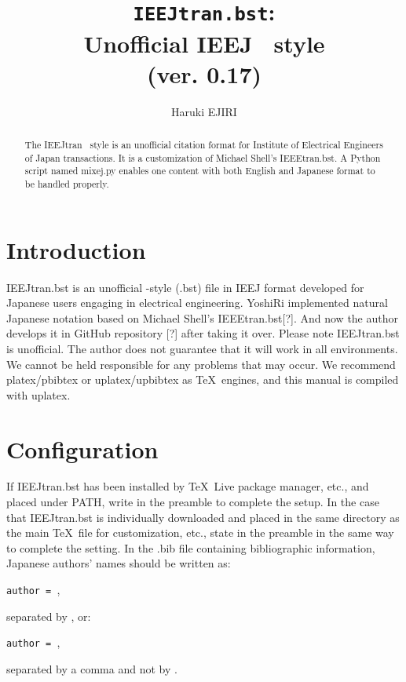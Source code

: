 \documentclass[11pt, a4paper, dvipdfmx]{article}
\title{\texttt{IEEJtran.bst}:\\Unofficial IEEJ \BibTeX\ style\\(ver. 0.17)}
\author{Haruki EJIRI}
\begin{document}
\maketitle

\begin{abstract}
The IEEJtran \BibTeX\ style is an unofficial citation format for Institute of Electrical Engineers of Japan transactions.
It is a customization of Michael Shell's IEEEtran.bst.
A Python script named mixej.py enables one content with both English and Japanese format to be handled properly.
\end{abstract}


\section{Introduction}

IEEJtran.bst is an unofficial \BibTeX-style (.bst) file in IEEJ format developed for Japanese users engaging in electrical engineering.
YoshiRi implemented natural Japanese notation based on Michael Shell's IEEEtran.bst[?].
And now the author develops it in GitHub repository [?] after taking it over.
Please note IEEJtran.bst is unofficial.
The author does not guarantee that it will work in all environments.
We cannot be held responsible for any problems that may occur.
We recommend platex/pbibtex or uplatex/upbibtex as \TeX\ engines, and this manual is compiled with uplatex.


\section{Configuration}

If IEEJtran.bst has been installed by \TeX\ Live package manager, etc., and placed under PATH, write  in the preamble to complete the setup.
In the case that IEEJtran.bst is individually downloaded and placed in the same directory as the main \TeX\ file for customization, etc., state  in the preamble in the same way to complete the setting.
In the .bib file containing bibliographic information, Japanese authors' names should be written as:
\begin{center}
\texttt{author = },
\end{center}
separated by \texttt{\string{\string}}, or:
\begin{center}
\texttt{author = },
\end{center}
separated by a comma and not by \texttt{\string{\string}}.
\end{document}
